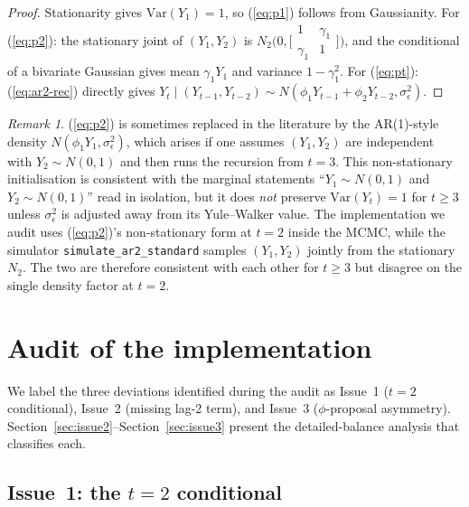 \documentclass[11pt]{article}
\newcommand{\eref}[1]{(\ref{#1})}
\newcommand{\sref}[1]{Section~\ref{#1}}
\theoremstyle{plain}
\theoremstyle{definition}
\theoremstyle{remark}
\newtheorem{remark}[proposition]{Remark}
\begin{document}
\begin{proof}
Stationarity gives $\mathrm{Var}(Y_1) = 1$, so \eref{eq:p1} follows from
Gaussianity. For \eref{eq:p2}: the stationary joint of $(Y_1, Y_2)$ is
$N_2\!\bigl(0, \bigl[\begin{smallmatrix}1 & \gamma_1\\\gamma_1 & 1\end{smallmatrix}\bigr]\bigr)$,
and the conditional of a bivariate Gaussian gives mean $\gamma_1 Y_1$ and
variance $1 - \gamma_1^2$. For \eref{eq:pt}: \eref{eq:ar2-rec} directly
gives $Y_t \mid (Y_{t-1}, Y_{t-2}) \sim N(\phi_1 Y_{t-1} + \phi_2 Y_{t-2},
\sigma_\epsilon^2)$.
\end{proof}

\begin{remark}\label{rem:fix1}
\eref{eq:p2} is sometimes replaced in the literature by the AR(1)-style
density $N(\phi_1 Y_1, \sigma_\epsilon^2)$, which arises if one assumes
$(Y_1, Y_2)$ are independent with $Y_2 \sim N(0,1)$ and then runs the
recursion from $t = 3$. This non-stationary initialisation is consistent
with the marginal statements ``$Y_1 \sim N(0,1)$ and $Y_2 \sim N(0,1)$''
read in isolation, but it does \emph{not} preserve $\mathrm{Var}(Y_t) = 1$
for $t \geq 3$ unless $\sigma_\epsilon^2$ is adjusted away from its
Yule--Walker value. The implementation we audit uses \eref{eq:p2}'s
non-stationary form at $t = 2$ inside the MCMC, while the simulator
\texttt{simulate\_ar2\_standard} samples $(Y_1, Y_2)$ jointly from the
stationary $N_2$. The two are therefore consistent with each other for
$t \geq 3$ but disagree on the single density factor at $t = 2$.
\end{remark}

\section{Audit of the implementation}\label{sec:audit}

We label the three deviations identified during the audit as Issue~1
($t = 2$ conditional), Issue~2 (missing lag-2 term), and Issue~3
($\phi$-proposal asymmetry). \sref{sec:issue2}--\sref{sec:issue3} present
the detailed-balance analysis that classifies each.

\subsection{Issue~1: the \texorpdfstring{$t = 2$}{t = 2} conditional}\label{sec:issue1}
\end{document}
